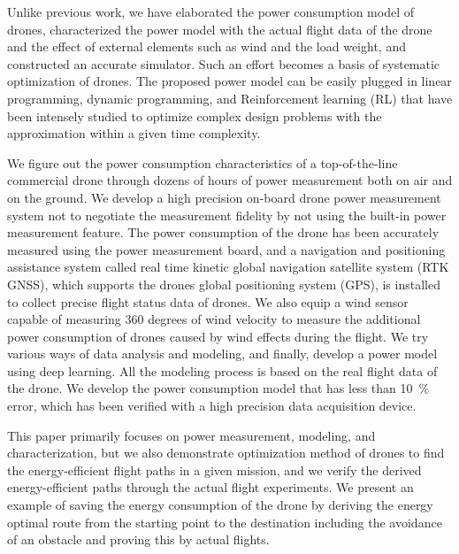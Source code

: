 \documentclass[journal]{./template/IEEEtran}
\begin{document}
Unlike previous work, we have elaborated the power consumption model of drones, characterized the power model with the actual flight data of the drone and the effect of external elements such as wind and the load weight, and constructed an accurate simulator.
Such an effort becomes a basis of systematic optimization of drones.
The proposed power model can be easily plugged in linear programming, dynamic programming, and Reinforcement learning (RL) that have been intensely studied to optimize complex design problems with the approximation within a given time complexity.

We figure out the power consumption characteristics of a top-of-the-line commercial drone through dozens of hours of power measurement both on air and on the ground.
We develop a high precision on-board drone power measurement system not to negotiate the measurement fidelity by not using the built-in power measurement feature. 
The power consumption of the drone has been accurately measured using the power measurement board, and a navigation and positioning assistance system called real time kinetic global navigation satellite system (RTK GNSS), which supports the drones global positioning system (GPS), is installed to collect precise flight status data of drones.
We also equip a wind sensor capable of measuring 360 degrees of wind velocity to measure the additional power consumption of drones caused by wind effects during the flight.
We try various ways of data analysis and modeling, and finally, develop a power model using deep learning.
All the modeling process is based on the real flight data of the drone. We develop the power consumption model that has less than 10~\% error, which has been verified with a high precision data acquisition device.

This paper primarily focuses on power measurement, modeling, and characterization, but we also demonstrate optimization method of drones to find the energy-efficient flight paths in a given mission, and we verify the derived energy-efficient paths through the actual flight experiments.
We present an example of saving the energy consumption of the drone by deriving the energy optimal route from the starting point to the destination including the avoidance of an obstacle and proving this by actual flights.
\end{document}
